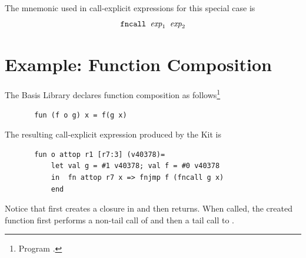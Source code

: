 \documentclass[12pt]{book}
\begin{document}
The mnemonic used in call-explicit expressions for this special case is
$$\hbox{\tt fncall $\hbox{\it exp}_1$ $\hbox{\it exp}_2$}$$

\section{Example: Function Composition}
The Basis Library declares function composition as follows\footnote{Program .}
\begin{verbatim}
       fun (f o g) x = f(g x)
\end{verbatim}
The resulting call-explicit expression produced by the Kit is
\begin{verbatim}
       fun o attop r1 [r7:3] (v40378)= 
           let val g = #1 v40378; val f = #0 v40378
           in  fn attop r7 x => fnjmp f (fncall g x)
           end 
\end{verbatim}
Notice that  first creates a closure in 
and then returns. When called, the created function first performs
a non-tail call of  and then a tail call to .
\end{document}
